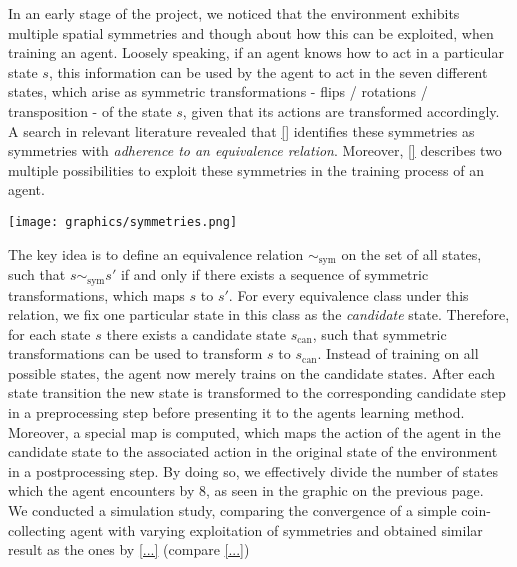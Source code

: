 

In an early stage of the project, we noticed that the environment exhibits multiple spatial symmetries and though about how this can be exploited, when training an agent. Loosely speaking, if an agent knows how to act in a particular state $s$, this information can be used by the agent to act in the seven different states, which arise as symmetric transformations - flips / rotations / transposition - of the state $s$, given that its actions are transformed accordingly.
A search in relevant literature revealed that \ref{} identifies these symmetries as symmetries with \emph{adherence to an equivalence relation}. Moreover, \ref{} describes two multiple possibilities to exploit these symmetries in the training process of an agent.

\vspace{10pt}
\begin{center}
\texttt{[image: graphics/symmetries.png]}
\end{center}
\vspace{10pt}

The key idea is to define an equivalence relation $\sim_\text{sym}$ on the set of all states, such that $s \sim_\text{sym} s'$ if and only if there exists a sequence of symmetric transformations, which maps $s$ to $s'$. For every equivalence class under this relation, we fix one particular state in this class as the \emph{candidate} state. Therefore, for each state $s$ there exists a candidate state $s_\text{can}$, such that symmetric transformations can be used to transform $s$ to $s_\text{can}$. Instead of training on all possible states, the agent now merely trains on the candidate states. After each state transition the new state is transformed to the corresponding candidate step in a preprocessing step before presenting it to the agents learning method. Moreover, a special map is computed, which maps the action of the agent in the candidate state to the associated action in the original state of the environment in a postprocessing step. By doing so, we effectively divide the number of states which the agent encounters by 8, as seen in the graphic on the previous page. \\

We conducted a simulation study, comparing the convergence of a simple coin-collecting agent with varying exploitation of symmetries and obtained similar result as the ones by \ref{...} (compare \ref{...})